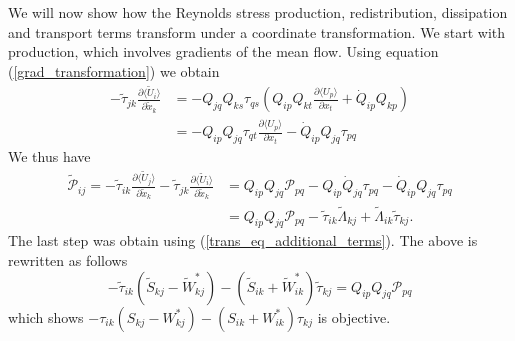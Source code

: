 \documentclass[oneside,a4paper,11pt]{report}
\newcommand{\rs}{\tau}          %
\newcommand{\upavg}{\langle U_p \rangle}
\begin{document}
We will now show how the Reynolds stress production, redistribution, dissipation and transport terms transform under a coordinate transformation. We start with production, which involves gradients of the mean flow. Using equation (\ref{grad_transformation}) we obtain
\begin{align}
-\tilde{\rs}_{jk} \frac{\partial \langle \tilde{U}_i \rangle}{\partial \tilde{x}_k}  &= -Q_{jq}Q_{ks} \rs_{qs} \left ( Q_{ip}Q_{kt} \frac{\partial \upavg}{\partial x_t} + \dot{Q}_{ip}Q_{kp} \right ) \nonumber \\
& = -Q_{ip}Q_{jq} \rs_{qt} \frac{\partial \upavg}{\partial x_t} - \dot{Q}_{ip}Q_{jq} \rs_{pq}
\end{align}
We thus have
\begin{align}
\label{production_transformation}
\tilde{\mathcal{P}}_{ij} = -\tilde{\rs}_{ik} \frac{\partial \langle \tilde{U}_j \rangle}{\partial \tilde{x}_k} - \tilde{\rs}_{jk} \frac{\partial \langle \tilde{U}_i \rangle}{\partial \tilde{x}_k}
& = Q_{ip}Q_{jq} \mathcal{P}_{pq} - Q_{ip}\dot{Q}_{jq} \rs_{pq}  - \dot{Q}_{ip}Q_{jq} \rs_{pq} \nonumber \\
& = Q_{ip}Q_{jq} \mathcal{P}_{pq} - \tilde{\rs}_{ik} \tilde{\Lambda}_{kj}  + \tilde{\Lambda}_{ik} \tilde{\rs}_{kj}.
\end{align}
The last step was obtain using (\ref{trans_eq_additional_terms}). The above is rewritten as follows
\begin{equation}
-\tilde{\rs}_{ik} (\tilde{S}_{kj} - \tilde{W}^*_{kj}) - (\tilde{S}_{ik} + \tilde{W}^*_{ik} ) \tilde{\rs}_{kj} = Q_{ip}Q_{jq} \mathcal{P}_{pq}
\end{equation}
which shows $ -\rs_{ik} (S_{kj} - W^*_{kj}) - (S_{ik} + W^*_{ik} ) \rs_{kj} $ is objective.
\end{document}
